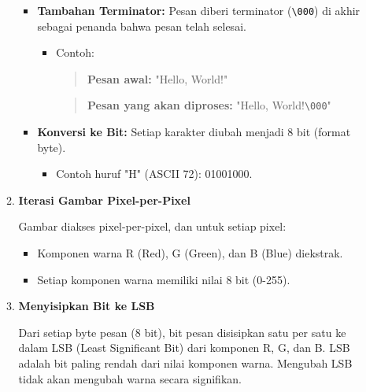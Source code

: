 \documentclass{ittelkom}
\begin{document}
\begin{enumerate}
\begin{enumerate}
\begin{itemize}
                        \item \textbf{Tambahan Terminator:}
                              Pesan diberi terminator (\texttt{\textbackslash 000}) di akhir sebagai penanda bahwa pesan telah selesai.
                              \begin{itemize}
                                  \item Contoh:
                                        \begin{quote}
                                            \textbf{Pesan awal:} "Hello, World!"
                                        \end{quote}
                                        \begin{quote}
                                            \textbf{Pesan yang akan diproses:} "Hello, World!\texttt{\textbackslash 000}"
                                        \end{quote}
                              \end{itemize}

                        \item \textbf{Konversi ke Bit:}
                              Setiap karakter diubah menjadi 8 bit (format byte).
                              \begin{itemize}
                                  \item Contoh huruf "H" (ASCII 72): 01001000.
                              \end{itemize}
                    \end{itemize}

              \item \textbf{Iterasi Gambar Pixel-per-Pixel}

                    Gambar diakses pixel-per-pixel, dan untuk setiap pixel:
                    \begin{itemize}
                        \item Komponen warna R (Red), G (Green), dan B (Blue) diekstrak.
                        \item Setiap komponen warna memiliki nilai 8 bit (0-255).
                    \end{itemize}

              \item \textbf{Menyisipkan Bit ke LSB}

                    Dari setiap byte pesan (8 bit), bit pesan disisipkan satu per satu ke dalam LSB
                    (Least Significant Bit) dari komponen R, G, dan B. LSB adalah bit paling rendah
                    dari nilai komponen warna. Mengubah LSB tidak akan mengubah warna secara
                    signifikan.


\end{enumerate}
\end{enumerate}
\end{document}
